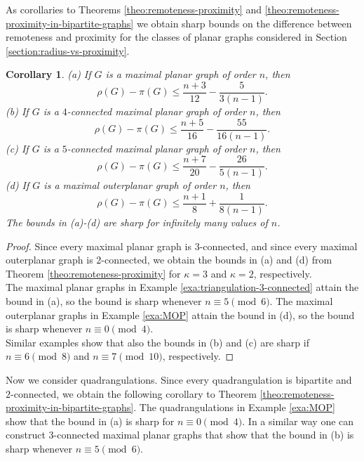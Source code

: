 \documentclass[a4paper,11pt]{article}
\newtheorem{corollary}[theorem]%
{Corollary}
\begin{document}
As corollaries to Theorems \ref{theo:remoteness-proximity} and 
\ref{theo:remoteness-proximity-in-bipartite-graphs} we obtain sharp bounds on the 
difference between remoteness and proximity for the classes of planar graphs
considered in Section \ref{section:radius-vs-proximity}. 
 

\begin{corollary} \label{coro:rho-pi-in-planar}
(a) If $G$ is a maximal planar graph of order $n$, then 
\[ \rho(G) - \pi(G) \leq \frac{n+3}{12}  - \frac{5}{3(n-1)}. \] 
(b) If $G$ is a $4$-connected maximal planar graph of order $n$, then 
\[ \rho(G) - \pi(G) \leq \frac{n+5}{16}  - \frac{55}{16(n-1)}. \]
(c) If $G$ is a $5$-connected maximal planar graph of order $n$, then 
\[ \rho(G) - \pi(G) \leq \frac{n+7}{20}  - \frac{26}{5(n-1)}. \]
(d) If $G$ is a maximal outerplanar graph of order $n$, then
\[ \rho(G) - \pi(G) \leq \frac{n+1}{8}  + \frac{1}{8(n-1)}. \] 
The bounds in (a)-(d) are sharp for infinitely many values of $n$. \\
\end{corollary}


\begin{proof}
Since every maximal planar graph is $3$-connected, and since every maximal outerplanar
graph is $2$-connected, we obtain the bounds in (a) and (d) from
Theorem \ref{theo:remoteness-proximity} for $\kappa=3$ and $\kappa=2$, respectively. \\ 
The maximal planar graphs in Example \ref{exa:triangulation-3-connected} attain the 
bound in (a), so the bound is sharp whenever $n \equiv 5 \pmod{6}$.
The maximal outerplanar graphs in Example  \ref{exa:MOP} attain the 
bound in (d), so the bound is sharp whenever $n \equiv 0 \pmod{4}$. \\
Similar examples show that also the bounds in (b) and (c) are sharp if 
$n \equiv 6\pmod{8}$ and $n \equiv 7 \pmod{10}$, respectively.   
\end{proof}






Now we consider quadrangulations. Since every quadrangulation is bipartite and $2$-connected,
we obtain the following corollary to Theorem \ref{theo:remoteness-proximity-in-bipartite-graphs}.
The quadrangulations in Example \ref{exa:MOP} show that the bound in (a) is sharp 
for $n \equiv 0 \pmod{4}$.
In a similar way one can construct $3$-connected maximal planar graphs that show that the bound
in (b) is sharp whenever $n \equiv 5 \pmod{6}$. 
\end{document}
